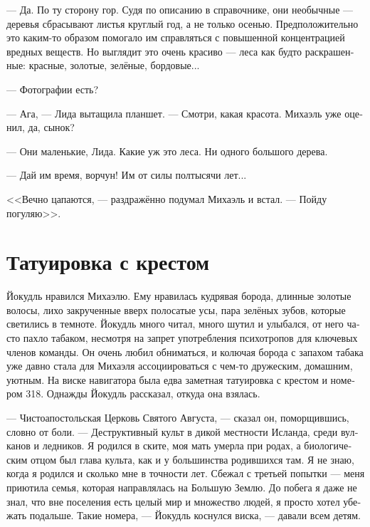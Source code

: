 \documentclass[a4paper,10pt,fleqn]{book}\usepackage{polyglossia}\setdefaultlanguage[babelshorthands=true]{russian}\setotherlanguage{english}\defaultfontfeatures{Ligatures=TeX,Mapping=tex-text}\usepackage{xcolor}\newcommand{\ml}[3]{#2}
\begin{document}
--- Да.
По ту сторону гор.
Судя по описанию в справочнике, они необычные --- деревья сбрасывают листья круглый год, а не только осенью.
Предположительно это каким-то образом помогало им справляться с повышенной концентрацией вредных веществ.
Но выглядит это очень красиво --- леса как будто раскрашенные: красные, золотые, зелёные, бордовые...

--- Фотографии есть?

--- Ага, --- Лида вытащила планшет.
--- Смотри, какая красота.
Михаэль уже оценил, да, сынок?

--- Они маленькие, Лида.
Какие уж это леса.
Ни одного большого дерева.

--- Дай им время, ворчун!
Им от силы полтысячи лет...

<<Вечно цапаются, --- раздражённо подумал Михаэль и встал.
--- Пойду погуляю>>.

\section{Татуировка с крестом}

Йокудль нравился Михаэлю.
Ему нравилась кудрявая борода, длинные золотые волосы, лихо закрученные вверх полосатые усы, пара зелёных зубов, которые светились в темноте.
Йокудль много читал, много шутил и улыбался, от него часто пахло табаком, несмотря на запрет употребления психотропов для ключевых членов команды.
Он очень любил обниматься, и колючая борода с запахом табака уже давно стала для Михаэля ассоциироваться с чем-то дружеским, домашним, уютным.
На виске навигатора была едва заметная татуировка с крестом и номером 318.
Однажды Йокудль рассказал, откуда она взялась.

--- Чистоапостольская Церковь Святого Августа, --- сказал он, поморщившись, словно от боли.
\ml{$0$}
{--- Деструктивный культ в дикой местности Исланда, среди вулканов и ледников.}
{``A destructive cult from Island wilderness, among volcanos and glaciers.}
Я родился в ските, моя мать умерла при родах, а биологическим отцом был глава культа, как и у большинства родившихся там.
Я не знаю, когда я родился и сколько мне в точности лет.
\ml{$0$}
{Сбежал с третьей попытки --- меня приютила семья, которая направлялась на Большую Землю.}
{It took me three attempts to escape, the family which took me in was en route to the Mainland.}
До побега я даже не знал, что вне поселения есть целый мир и множество людей, я просто хотел убежать подальше.
Такие номера, --- Йокудль коснулся виска, --- давали всем детям.
\end{document}
